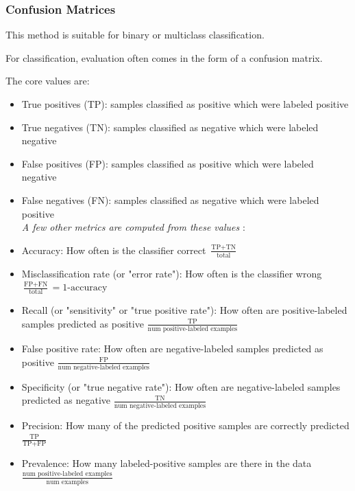 \subsubsection{Confusion Matrices}
This method is suitable for binary or multiclass classification.

For classification, evaluation often comes in the form of a confusion matrix.

The core values are:
\begin{itemize}
\item True positives (TP): samples classified as positive which were labeled positive
\item True negatives (TN): samples classified as negative which were labeled negative
\item False positives (FP): samples classified as positive which were labeled negative
\item False negatives (FN): samples classified as negative which were labeled positive\\

\textit{A few other metrics are computed from these values }:\\

\item Accuracy: How often is the classifier correct  $\frac{\text{TP} + \text{TN}}{\text{total}}$

\item Misclassification rate (or "error rate"): How often is the classifier wrong $\frac{\text{FP} + \text{FN}}{\text{total}} = 1 $-$ \text{accuracy}$

\item Recall (or "sensitivity" or "true positive rate"): How often are positive-labeled samples predicted as positive $\frac{\text{TP}}{\text{num positive-labeled examples}}$

\item False positive rate: How often are negative-labeled samples predicted as positive  $\frac{\text{FP}}{\text{num negative-labeled examples}}$

\item Specificity (or "true negative rate"): How often are negative-labeled samples predicted as negative  $\frac{\text{TN}}{\text{num negative-labeled examples}}$
\item Precision: How many of the predicted positive samples are correctly predicted   $\frac{\text{TP}}{\text{TP} + \text{FP}}$

\item Prevalence: How many labeled-positive samples are there in the data  $\frac{\text{num positive-labeled examples}}{\text{num examples}}$ 


\end{itemize}
